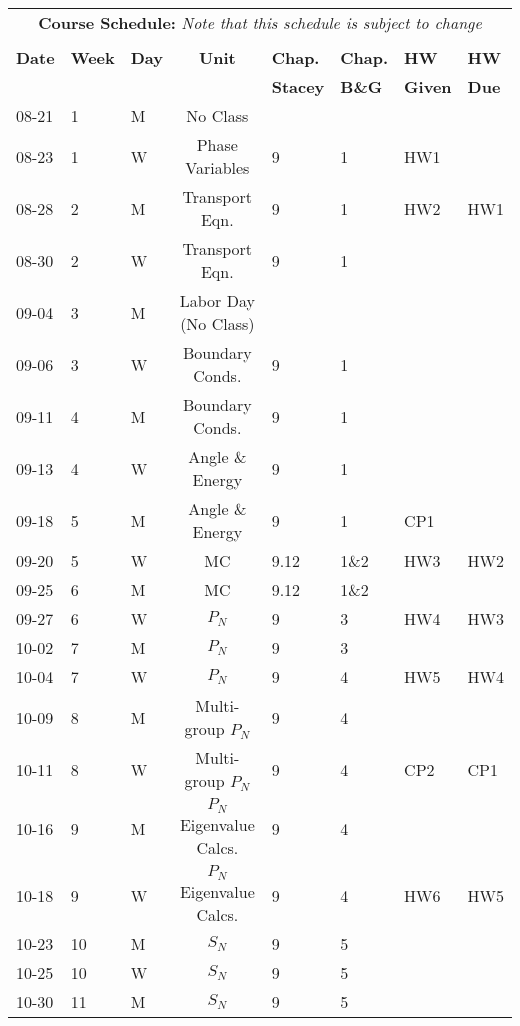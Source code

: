 \documentclass[11pt, a4paper]{article}
\begin{document}
\pagebreak
\FloatBarrier
\renewcommand{\arraystretch}{1}
\begin{table}[h]
\begin{center}
\begin{tabular}{lllcllll}
\multicolumn{8}{c}{\textbf{Course Schedule:}\textit{ Note that this schedule is subject to change}}\\
&&&&&&&\\
\textbf{Date} & \textbf{Week} & \textbf{Day} & \textbf{Unit} & \textbf{Chap.} & \textbf{Chap.} & \textbf{HW} & \textbf{HW}\\
              &  &  & & \textbf{Stacey}& \textbf{B\&G} & \textbf{Given} & \textbf{Due}\\
\hline
\hline
08-21 & 1 & M & No Class        &  &  &  & \\
08-23 & 1 & W & Phase Variables & 9 & 1 & HW1 & \\
08-28 & 2 & M & Transport Eqn.  & 9 & 1 & HW2 & HW1\\
08-30 & 2 & W & Transport Eqn.  & 9 & 1 &  & \\
09-04 & 3 & M & Labor Day (No Class) &  &  &  & \\
09-06 & 3 & W & Boundary Conds. & 9 & 1 &  & \\
09-11 & 4 & M & Boundary Conds. & 9 & 1 &  & \\
09-13 & 4 & W & Angle \& Energy & 9 & 1 &  & \\
09-18 & 5 & M & Angle \& Energy & 9 & 1 & CP1 & \\
09-20 & 5 & W & MC              & 9.12 & 1\&2 &  HW3 & HW2\\
09-25 & 6 & M & MC              & 9.12 & 1\&2 &  & \\
09-27 & 6 & W & $P_N$           & 9 & 3 & HW4 & HW3\\
10-02 & 7 & M & $P_N$           & 9 & 3 &  & \\
10-04 & 7 & W & $P_N$           & 9 & 4 & HW5  & HW4\\
10-09 & 8 & M & Multi-group $P_N$ & 9 & 4 &  & \\
10-11 & 8 & W & Multi-group $P_N$ & 9 & 4 & CP2 & CP1\\
10-16 & 9 & M & $P_N$ Eigenvalue Calcs.& 9 & 4 &  &   \\
10-18 & 9 & W & $P_N$ Eigenvalue Calcs. & 9 & 4 & HW6 & HW5\\
10-23 & 10 & M & $S_N$          & 9 & 5 &  & \\
10-25 & 10 & W & $S_N$          & 9 & 5 &  & \\
10-30 & 11 & M & $S_N$          & 9 & 5 &     &    \\

\end{tabular}
\end{center}
\end{table}
\end{document}
